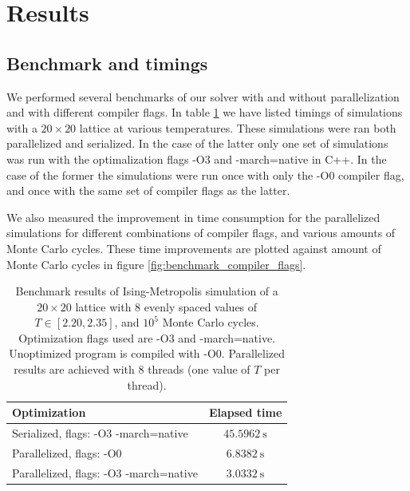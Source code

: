 \documentclass[reprint,english,notitlepage]{revtex4-1}  %
\begin{document}
\newpage

\section{Results} \label{sec:IV}

\subsection{Benchmark and timings} \label{sec:IV:A}

We performed several benchmarks of our solver with and without parallelization and with different compiler flags. In table \ref{table:benchmark_parallel} we have listed timings of simulations with a $20 \times 20$ lattice at various temperatures. These simulations were ran both parallelized and serialized. In the case of the latter only one set of simulations was run with the optimalization flags -O3 and -march=native in C++. In the case of the former the simulations were run once with only the -O0 compiler flag, and once with the same set of compiler flags as the latter.

We also measured the improvement in time consumption for the parallelized simulations for different combinations of compiler flags, and various amounts of Monte Carlo cycles. These time improvements are plotted against amount of Monte Carlo cycles in figure \ref{fig:benchmark_compiler_flags}.

\begin{table}[H]
	\centering
	\begin{tabular}{|l|c|}
		\hline
		Optimization & Elapsed time \\
		\hline
		Serialized, flags: -O3 -march=native & \(\SI{45.5962}{\second}\) \\
		Parallelized, flags: -O0 & \(\SI{6.8382}{\second}\) \\
		Parallelized, flags: -O3 -march=native & \(\SI{3.0332}{\second}\) \\
		\hline
	\end{tabular}
	\label{table:benchmark_parallel}
	\caption{Benchmark results of Ising-Metropolis simulation of a \(20\times 20\) lattice with \(8\) evenly spaced values of \(T \in [2.20, 2.35]\), and \(10^{5}\) Monte Carlo cycles. Optimization flags used are -O3 and -march=native. Unoptimized program is compiled with -O0. Parallelized results are achieved with \(8\) threads (one value of \(T\) per thread).}
\end{table}
\end{document}
